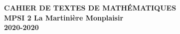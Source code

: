 \documentclass[12pt,a4paper]{article}
\begin{document}
\begin{center}
\Large\bf CAHIER DE TEXTES DE MATHÉMATIQUES\\
MPSI 2 La Martinière Monplaisir\\ 2020-2020
\end{center}
\vspace{1cm}
\vspace{.4cm}

% 
% 
% 
% 
% 
% 
% 
% 
% 

% 
%
\end{document}

